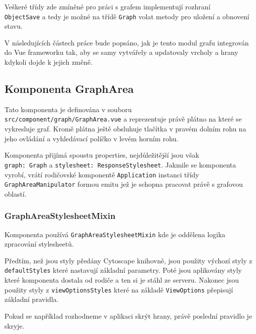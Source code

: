 \bigskip

Veškeré třídy zde zmíněné pro práci s grafem implementují rozhraní \\\texttt{ObjectSave} a tedy je možné na třídě \texttt{Graph} volat metody pro uložení a obnovení stavu.

\newpage

V následujících částech práce bude popsáno, jak je tento modul grafu integrován do Vue frameworku tak, aby se samy vytvářely a updatovaly vrcholy a hrany kdykoli dojde k jejich změně.

\subsection{Komponenta GraphArea}
Tato komponenta je definována v souboru \\\texttt{src/component/graph/GraphArea.vue} a reprezentuje právě plátno na které se vykresluje graf. Kromě plátna ještě obsluhuje tlačítka v pravém dolním rohu na jeho ovládání a vyhledávací políčko v levém horním rohu.

Komponenta přijímá spoustu properties, nejdůležitější jsou však \\\texttt{graph: Graph} a \texttt{stylesheet: ResponseStylesheet}. Jakmile se komponenta vyrobí, vrátí rodičovské komponentě \texttt{Application} instanci třídy \texttt{GraphAreaManipulator} formou emitu jež je schopna pracovat právě s grafovou oblastí.

\subsubsection{GraphAreaStylesheetMixin}

Komponenta používá \texttt{GraphAreaStylesheetMixin} kde je oddělena logika zpracování stylesheetů.

Předtím, než jsou styly předány Cytoscape knihovně, jsou použity výchozí styly z \texttt{defaultStyles} které nastavují základní parametry. Poté jsou aplikovány styly které komponenta dostala od rodiče a ten si je stáhl ze serveru. Nakonec jsou použity styly z \texttt{viewOptionsStyles} které na základě \texttt{ViewOptions} přepisují základní pravidla.

Pokud se například rozhodneme v aplikaci skrýt hrany, právě poslední pravidlo je skryje.


